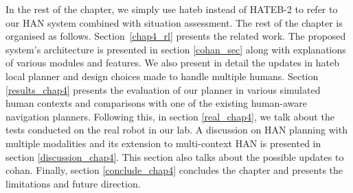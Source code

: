 In the rest of the chapter, we simply use \acrshort{hateb} instead of HATEB-2 to refer to our HAN system combined with situation assessment. The rest of the chapter is organised as follows. Section~\ref{chap4_rl} presents the related work. The proposed system's architecture is presented in section \ref{cohan_sec} along with explanations of various modules and features. We also present in detail the updates in \acrshort{hateb} local planner and design choices made to handle multiple humans. Section \ref{results_chap4} presents the evaluation of our planner in various simulated human contexts and comparisons with one of the existing human-aware navigation planners. Following this, in section \ref{real_chap4}, we talk about the tests conducted on the real robot in our lab. A discussion on HAN planning with multiple modalities and its extension to multi-context HAN is presented in section \ref{discussion_chap4}. This section also talks about the possible updates to \acrshort{cohan}. Finally, section \ref{conclude_chap4} concludes the chapter and presents the limitations and future direction.

